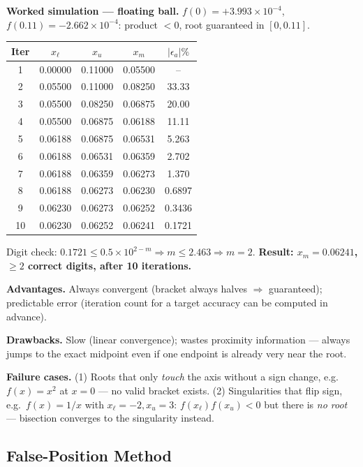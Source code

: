 \begin{examplebox}
\textbf{Worked simulation — floating ball.} $f(0)=+3.993\times10^{-4}$, $f(0.11)=-2.662\times10^{-4}$: product $<0$, root guaranteed in $[0,0.11]$.
\begin{center}\small
\begin{tabular}{@{}ccccc@{}}
\toprule
Iter & $x_\ell$ & $x_u$ & $x_m$ & $|\epsilon_a|\%$\\
\midrule
1 & 0.00000 & 0.11000 & 0.05500 & --\\
2 & 0.05500 & 0.11000 & 0.08250 & 33.33\\
3 & 0.05500 & 0.08250 & 0.06875 & 20.00\\
4 & 0.05500 & 0.06875 & 0.06188 & 11.11\\
5 & 0.06188 & 0.06875 & 0.06531 & 5.263\\
6 & 0.06188 & 0.06531 & 0.06359 & 2.702\\
7 & 0.06188 & 0.06359 & 0.06273 & 1.370\\
8 & 0.06188 & 0.06273 & 0.06230 & 0.6897\\
9 & 0.06230 & 0.06273 & 0.06252 & 0.3436\\
10& 0.06230 & 0.06252 & 0.06241 & 0.1721\\
\bottomrule
\end{tabular}
\end{center}
Digit check: $0.1721\le0.5\times10^{2-m}\Rightarrow m\le2.463\Rightarrow m=2$. \textbf{Result: $x_m=0.06241$, $\ge2$ correct digits, after 10 iterations.}
\end{examplebox}

\textbf{Advantages.} Always convergent (bracket always halves $\Rightarrow$ guaranteed); predictable error (iteration count for a target accuracy can be computed in advance).

\textbf{Drawbacks.} Slow (linear convergence); wastes proximity information — always jumps to the exact midpoint even if one endpoint is already very near the root.

\textbf{Failure cases.} (1) Roots that only \emph{touch} the axis without a sign change, e.g.\ $f(x)=x^2$ at $x=0$ — no valid bracket exists. (2) Singularities that flip sign, e.g.\ $f(x)=1/x$ with $x_\ell=-2,x_u=3$: $f(x_\ell)f(x_u)<0$ but there is \emph{no root} — bisection converges to the singularity instead.

\subsection{False-Position Method}

